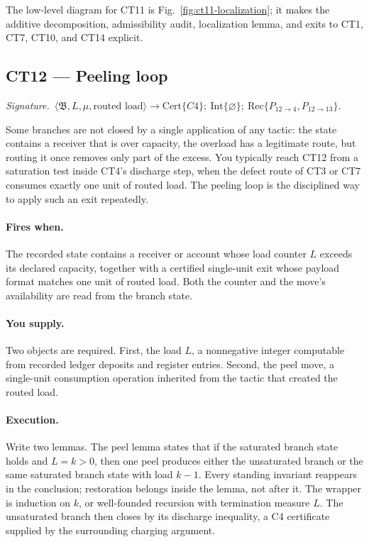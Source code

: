 \documentclass[
  11pt,
]{article}
\theoremstyle{definition}
\newcommand{\ctsignature}[1]{\par\noindent\emph{Signature.}\ #1\par\medskip}
\newcommand{\ctcert}[1]{\mathrm{Cert}\{#1\}}
\newcommand{\ctint}[1]{\mathrm{Int}\{#1\}}
\newcommand{\ctrec}[1]{\mathrm{Rec}\{#1\}}
\newcommand{\ctnone}{\varnothing}
\newcommand{\ctpar}[1]{\paragraph{#1.}}
\begin{document}
The low-level diagram for CT11 is Fig.~\ref{fig:ct11-localization};
it makes the additive decomposition, admissibility audit,
localization lemma, and exits to CT1, CT7, CT10, and CT14 explicit.



\subsection{CT12 --- Peeling loop}\label{ct:12}\label{peeling-loops-closure-by-well-founded-recursion}
\ctsignature{\(\langle\mathfrak B,L,\mu,\text{routed load}\rangle
\to \ctcert{C4};\ \ctint{\ctnone};\ \ctrec{P_{12\to4},P_{12\to13}}\).}

Some branches are not closed by a single application of any tactic: the
state contains a receiver that is over capacity, the overload has a
legitimate route, but routing it once removes only part of the excess.
You typically reach CT12 from a saturation test inside CT4's discharge
step, when the defect route of CT3 or CT7 consumes exactly one unit of
routed load.  The peeling loop is the disciplined way to apply such an
exit repeatedly.

\ctpar{Fires when}
The recorded state contains a receiver or account whose load counter
\(L\) exceeds its declared capacity, together with a certified
single-unit exit whose payload format matches one unit of routed load.
Both the counter and the move's availability are read from the branch
state.

\ctpar{You supply}
Two objects are required.  First, the load \(L\), a nonnegative integer
computable from recorded ledger deposits and register entries.  Second,
the peel move, a single-unit consumption operation inherited from the
tactic that created the routed load.

\ctpar{Execution}
Write two lemmas.  The peel lemma states that if the saturated branch
state holds and \(L=k>0\), then one peel produces either the unsaturated
branch or the same saturated branch state with load \(k-1\).  Every
standing invariant reappears in the conclusion; restoration belongs
inside the lemma, not after it.  The wrapper is induction on \(k\), or
well-founded recursion with termination measure \(L\).  The unsaturated
branch then closes by its discharge inequality, a C4 certificate supplied
by the surrounding charging argument.
\end{document}
